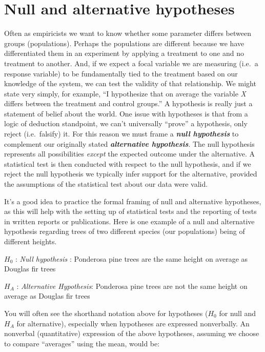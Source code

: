 \documentclass[]{book}
\begin{document}
\hypertarget{null-and-alternative-hypotheses}{%
\section{Null and alternative hypotheses}\label{null-and-alternative-hypotheses}}

Often as empiricists we want to know whether some parameter differs between groups (populations). Perhaps the populations are different because we have differentiated them in an experiment by applying a treatment to one and no treatment to another. And, if we expect a focal variable we are measuring (i.e.~a response variable) to be fundamentally tied to the treatment based on our knowledge of the system, we can test the validity of that relationship. We might state very simply, for example, ``I hypothesize that on average the variable \emph{X} differs between the treatment and control groups.'' A hypothesis is really just a statement of belief about the world. One issue with hypotheses is that from a logic of deduction standpoint, we can't universally ``prove'' a hypothesis, only reject (i.e.~falsify) it. For this reason we must frame a \textbf{\emph{null hypothesis}} to complement our originally stated \textbf{\emph{alternative hypothesis}}. The null hypothesis represents all possibilities \emph{except} the expected outcome under the alternative. A statistical test is then conducted with respect to the null hypothesis, and if we reject the null hypothesis we typically infer support for the alternative, provided the assumptions of the statistical test about our data were valid.

It's a good idea to practice the formal framing of null and alternative hypotheses, as this will help with the setting up of statistical tests and the reporting of tests in written reports or publications. Here is one example of a null and alternative hypothesis regarding trees of two different species (our populations) being of different heights.

\(H_0\) : \emph{Null hypothesis} : Ponderosa pine trees are the same height on average as Douglas fir trees

\(H_A\) : \emph{Alternative Hypothesis}: Ponderosa pine trees are not the same height on average as Douglas fir trees

You will often see the shorthand notation above for hypotheses (\(H_0\) for null and \(H_A\) for alternative), especially when hypotheses are expressed nonverbally. An nonverbal (quantitative) expression of the above hypotheses, assuming we choose to compare ``averages'' using the mean, would be:
\end{document}
